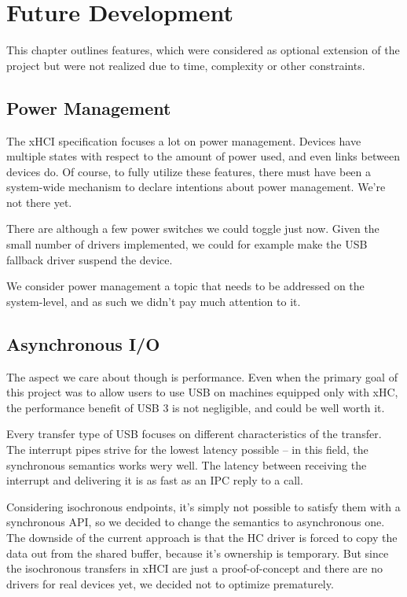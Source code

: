 \chapter{Future Development}

This chapter outlines features, which were considered as optional extension of
the project but were not realized due to time, complexity or other constraints.

\section{Power Management}

The xHCI specification focuses a lot on power management. Devices have multiple
states with respect to the amount of power used, and even links between devices
do. Of course, to fully utilize these features, there must have been
a system-wide mechanism to declare intentions about power management. We're not
there yet.

There are although a few power switches we could toggle just now. Given the
small number of drivers implemented, we could for example make the USB fallback
driver suspend the device.

We consider power management a topic that needs to be addressed on the
system-level, and as such we didn't pay much attention to it.

\section{Asynchronous I/O}

The aspect we care about though is performance. Even when the primary goal of
this project was to allow users to use USB on machines equipped only with xHC,
the performance benefit of USB 3 is not negligible, and could be well worth it.

Every transfer type of USB focuses on different characteristics of the
transfer. The interrupt pipes strive for the lowest latency possible -- in this
field, the synchronous semantics works wery well. The latency between receiving
the interrupt and delivering it is as fast as an IPC reply to a call.

Considering isochronous endpoints, it's simply not possible to satisfy them
with a synchronous API, so we decided to change the semantics to asynchronous
one. The downside of the current approach is that the HC driver is forced to
copy the data out from the shared buffer, because it's ownership is temporary.
But since the isochronous transfers in xHCI are just a proof-of-concept and
there are no drivers for real devices yet, we decided not to optimize
prematurely.

